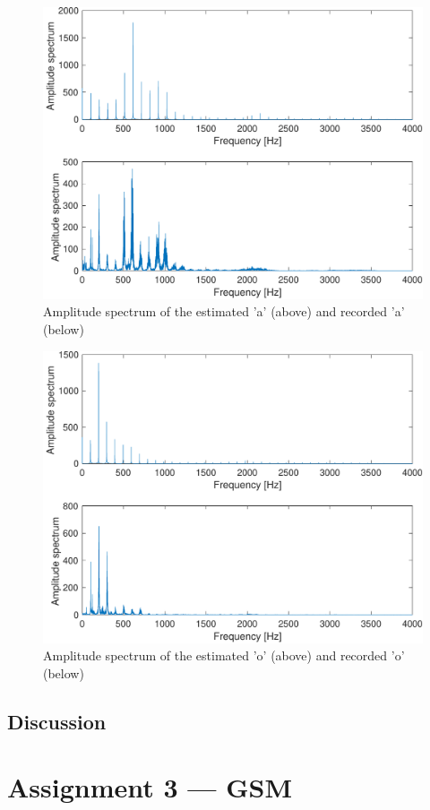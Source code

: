\documentclass{IEEEtran}
\begin{document}
\begin{figure}[h!]
    \centering
    \captionsetup{justification=centering}
    \includegraphics[width=0.8\columnwidth]{pictures/apreddft.pdf}
    \caption{Amplitude spectrum of the estimated 'a' (above) and recorded
    'a' (below)}
    \label{fig:adft}
\end{figure}

\begin{figure}[h!]
    \centering
    \captionsetup{justification=centering}
    \includegraphics[width=0.8\columnwidth]{pictures/opreddft.pdf}
    \caption{Amplitude spectrum of the estimated 'o' (above) and recorded
    'o' (below)}
    \label{fig:odft}
\end{figure}

\subsection{Discussion}

\section{Assignment 3 --- GSM}
\end{document}
